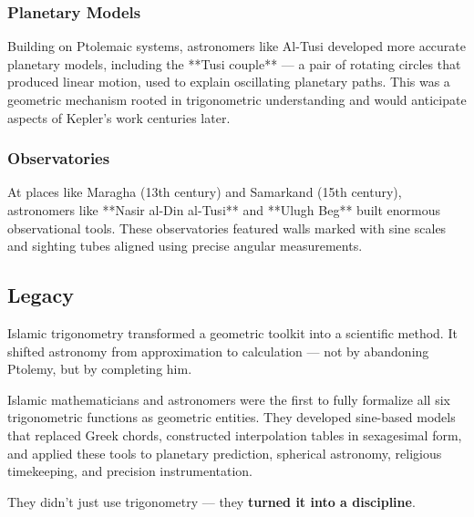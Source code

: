 \subsubsection{Planetary Models} 

Building on Ptolemaic systems, astronomers like Al-Tusi developed more accurate planetary models, including the **Tusi couple** — a pair of rotating circles that produced linear motion, used to explain oscillating planetary paths. This was a geometric mechanism rooted in trigonometric understanding and would anticipate aspects of Kepler's work centuries later.

\subsubsection{Observatories} 

At places like Maragha (13th century) and Samarkand (15th century), astronomers like **Nasir al-Din al-Tusi** and **Ulugh Beg** built enormous observational tools. These observatories featured walls marked with sine scales and sighting tubes aligned using precise angular measurements.

\subsection{Legacy}

Islamic trigonometry transformed a geometric toolkit into a scientific method. It shifted astronomy from approximation to calculation — not by abandoning Ptolemy, but by completing him.

\medskip

\begin{tcolorbox}[colback=gray!5!white, colframe=black, title=\textbf{TL;DR: When Trigonometry Became a Science}, fonttitle=\bfseries, arc=1.5mm, boxrule=0.4pt]
Islamic mathematicians and astronomers were the first to fully formalize all six trigonometric functions as geometric entities. They developed sine-based models that replaced Greek chords, constructed interpolation tables in sexagesimal form, and applied these tools to planetary prediction, spherical astronomy, religious timekeeping, and precision instrumentation.

They didn’t just use trigonometry — they \textbf{turned it into a discipline}.
\end{tcolorbox}

